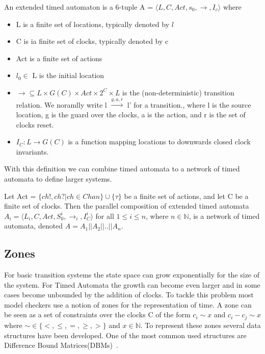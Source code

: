 \documentclass[11pt]{article}
\begin{document}
\begin{mydef}
\label{def:TA}
An extended timed automaton is a 6-tuple A = $\langle L, C, Act, s_0, \rightarrow, I_c\rangle$ where
{\renewcommand\labelitemi{--}
	\begin{itemize}
		\item L is a finite set of locations, typically denoted by $l$
		\item C is ia finite set of clocks, typically denoted by c
		\item Act is a finite set of actions
		\item $l_0 \in$ L is the initial location
		\item $\rightarrow \subseteq L \times G(C) \times Act \times 2^C \times L$ is the (non-deterministic) transition relation. We noramlly write l $\stackrel{g,a,r}{\longrightarrow}$ l' for a transition., where l is the source location, g is the guard over the clocks, a is the action, and r is the set of clocks reset.
		\item $I_C : L \rightarrow G(C)$ is a function mapping locations to downwards closed clock invariants.
	\end{itemize}
}
\end{mydef}

With this definition we can combine timed automata to a network of timed automata to define larger systems.

\begin{mydef}
\label{def:networkTA}
Let Act = $\{ch!,ch?|ch \in Chan\} \cup \{\tau\}$ be a finite set of actions, and let C be a finite set of clocks. Then the parallel composition of extended timed automata $A_i = \langle L_i, C, Act, S^i_0, \rightarrow_{i}, I^i_C\rangle$ for all $1 \leq i \leq n$, where $n \in \mathbb{N}$, is a network of timed automata, denoted $A = A_1||A_2||..||A_n$.
\end{mydef}

\subsection{Zones}
For basic transition systems the state space can grow exponentially for the size of the system. For Timed Automata the growth can become even larger and in some cases become unbounded by the addition of clocks. To tackle this problem most model checkers use a notion of zones for the representation of time. A zone can be seen as a set of constraints over the clocks C of the form $c_i \sim x$ and $c_i - c_j \sim x$ where $\sim  \in \{<, \leq, =, \geq, >\}$ and $x \in \mathbb{N}$. To represent these zones several data structures have been developed. One of the most common used structures are Difference Bound Matrices(DBMs)~\cite{dbmorig,bengtsson2002clocks}.
 
\end{document}
